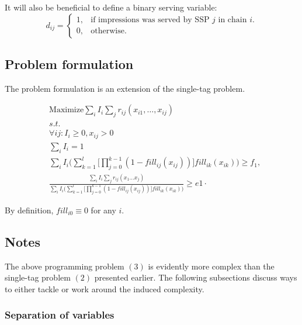 \documentclass{article}
\begin{document}
\begin{large}
It will also be beneficial to define a binary serving variable: 
\begin{equation*}
 d_{ij} =\begin{cases}
    1, & \text{if impressions was served by SSP $j$ in chain $i$}.\\
    0, & \text{otherwise}.
  \end{cases}
\end{equation*}


\subsection{Problem formulation}
The problem formulation is an extension of the single-tag problem.

\begin{equation}
\begin{aligned}
&\text{Maximize} \sum_{i}{I_i \sum_{j}{r_{ij}(x_{i1},\dots, x_{ij})}} \\
&s.t. \\ 
&\forall ij: I_i \geq 0 , x_{ij} > 0\\
&\sum_{i}{I_i}=1\\
&\sum_{i}{I_i \Big( \sum_{k=1}^{l}\Big[{\prod_{j=0}^{k-1}{(1-fill_{ij}(x_{ij}))  } \Big] fill_{ik}(x_{ik})}} \Big) \geq f_1,\\ 
&\frac{\sum_{i}{I_i \sum_{j}{r_{ij}(x_1\dots x_j)}}}{\sum_{i}{I_i \Big( \sum_{k=1}^{l}\Big[{\prod_{j=0}^{k-1}{(1-fill_{ij}(x_{ij}))  } \Big] fill_{ik}(x_{ik})}} \Big) } \geq e1 \cdot
\end{aligned} 
\end{equation}

By definition, $fill_{i0} \equiv 0$ for any $i$.

\subsection{Notes}
The above programming problem $(3)$ is evidently more complex than the single-tag problem $(2)$ presented earlier. The following subsections discuss ways to either tackle or work around the induced complexity. 

\subsubsection{Separation of variables}


\end{large}
\end{document}
